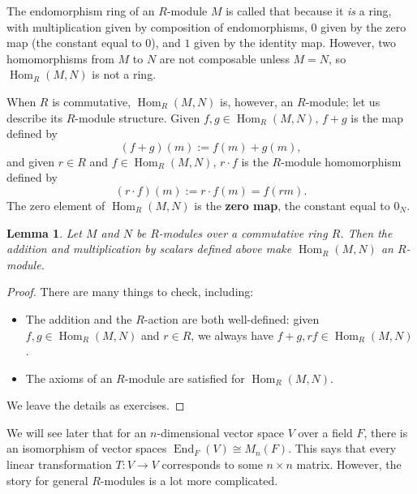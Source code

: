 \documentclass[12pt]{report}
\newtheorem{lemma}[theorem]{Lemma}
\numberwithin{equation}{section}
\numberwithin{theorem}{chapter}
\theoremstyle{definition}
\newtheorem*{basic properties}{Basic Properties}
\newtheorem*{Important Remark}{Important Remark}
\DeclareMathOperator{\End}{End}
\DeclareMathOperator{\Hom}{Hom}
\begin{document}
The endomorphism ring of an $R$-module $M$ is called that because it \emph{is} a ring, with multiplication given by composition of endomorphisms, $0$ given by the zero map (the constant equal to $0$), and $1$ given by the identity map. 
However, two homomorphisms from $M$ to $N$ are not composable unless $M = N$, so $\Hom_R(M,N)$ is not a ring. 

When $R$ is commutative, $\Hom_R(M,N)$ is, however, an $R$-module; let us describe its $R$-module structure.
	Given $f, g \in \Hom_R(M,N)$, $f+g$ is the map defined by
	$$(f+g)(m) := f(m) + g(m),$$ 
	and given $r \in R$ and $f \in \Hom_R(M,N)$, $r \cdot f$ is the $R$-module homomorphism defined by
	$$(r \cdot f) (m) := r \cdot f(m) = f(rm).$$
	The zero element of $\Hom_R(M,N)$ is the {\bf zero map}, the constant equal to $0_N$.

\begin{lemma}\label{Hom is an Rmod}
	Let $M$ and $N$ be $R$-modules over a commutative ring $R$. Then the addition and multiplication by scalars defined above make $\Hom_R(M,N)$ an $R$-module.
\end{lemma}

\begin{proof}
There are many things to check, including:
\begin{itemize}
\item The addition and the $R$-action are both well-defined: given $f,g\in \Hom_R(M,N)$ and $r\in R$, we always have $f+g, rf\in \Hom_R(M,N)$.
\item The axioms of an $R$-module are satisfied for $\Hom_R(M,N)$.
\end{itemize}
 We leave the details as exercises.
\end{proof}


We will see later that for an $n$-dimensional vector space $V$ over a field $F$, there is an isomorphism of vector spaces $\End_F(V)\cong M_n(F)$. This says that every linear transformation $T:V\to V$ corresponds to some $n\times n$ matrix. However, the story for general $R$-modules is a lot more complicated.
\end{document}

